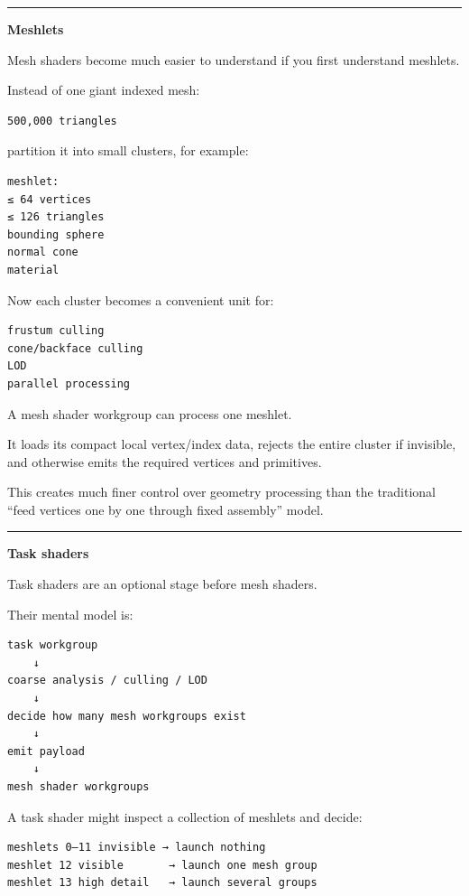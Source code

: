 \begin{center}\rule{0.5\linewidth}{0.5pt}\end{center}

\textbf{Meshlets}

Mesh shaders become much easier to understand if you first understand meshlets.

Instead of one giant indexed mesh:

\begin{verbatim}
500,000 triangles
\end{verbatim}

partition it into small clusters, for example:

\begin{verbatim}
meshlet:
≤ 64 vertices
≤ 126 triangles
bounding sphere
normal cone
material
\end{verbatim}

Now each cluster becomes a convenient unit for:

\begin{verbatim}
frustum culling
cone/backface culling
LOD
parallel processing
\end{verbatim}

A mesh shader workgroup can process one meshlet.

It loads its compact local vertex/index data, rejects the entire cluster if invisible, and otherwise emits the required vertices and primitives.

This creates much finer control over geometry processing than the traditional ``feed vertices one by one through fixed assembly'' model.

\begin{center}\rule{0.5\linewidth}{0.5pt}\end{center}

\textbf{Task shaders}

Task shaders are an optional stage before mesh shaders.

Their mental model is:

\begin{verbatim}
task workgroup
    ↓
coarse analysis / culling / LOD
    ↓
decide how many mesh workgroups exist
    ↓
emit payload
    ↓
mesh shader workgroups
\end{verbatim}

A task shader might inspect a collection of meshlets and decide:

\begin{verbatim}
meshlets 0–11 invisible → launch nothing
meshlet 12 visible       → launch one mesh group
meshlet 13 high detail   → launch several groups
\end{verbatim}


